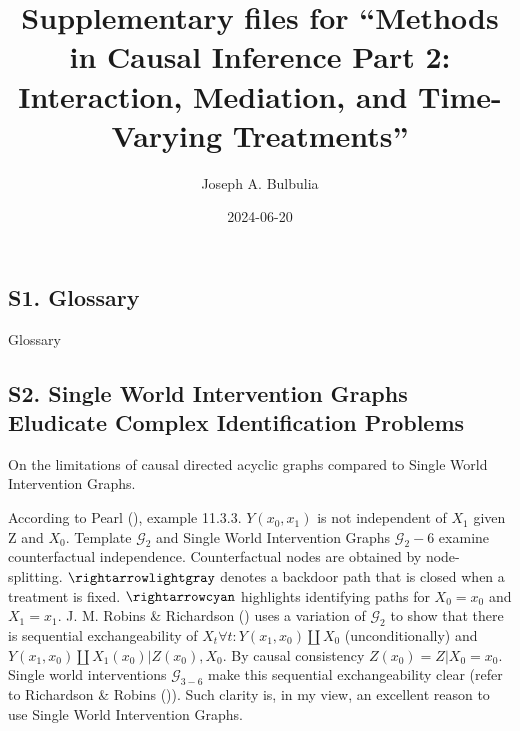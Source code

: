\documentclass[
  single column]{article}
\title{Supplementary files for ``Methods in Causal Inference Part 2:
Interaction, Mediation, and Time-Varying Treatments''}
\author{Joseph A. Bulbulia}
\affil{%
             \small{     Victoria University of Wellington, New Zealand
          ORCID \textcolor[HTML]{A6CE39}{\aiOrcid} ~0000-0002-5861-2056 }
              }
\date{2024-06-20}
\renewcommand*\contentsname{Table of contents}
\newcommand\contentsname{Table of contents}
\begin{document}
\maketitle

\renewcommand*\contentsname{Table of contents}
{
\hypersetup{linkcolor=}
\setcounter{tocdepth}{2}
\tableofcontents
}
\listoftables
\newpage{}

\subsection{S1. Glossary}\label{id-app-a}

\begin{table}

\caption{\label{tbl-experiments}Glossary}

\centering{

\glossaryTerms

}

\end{table}%

\newpage{}

\subsection{S2. Single World Intervention Graphs Eludicate Complex
Identification Problems}\label{id-app-b}

\begin{table}

\caption{\label{tbl-pearltable}On the limitations of causal directed
acyclic graphs compared to Single World Intervention Graphs.}

\centering{

\pearltable

}

\end{table}%

According to Pearl (), example 11.3.3.
\(Y(x_0, x_1)\) is not independent of \(X_1\) given Z and \(X_0\).
Template \(\mathcal{G}_2\) and Single World Intervention Graphs
\(\mathcal{G}_2-6\) examine counterfactual independence. Counterfactual
nodes are obtained by node-splitting. \(\rightarrowlightgray\) denotes a
backdoor path that is closed when a treatment is fixed.
\(\rightarrowcyan\) highlights identifying paths for \(X_0 = x_0\) and
\(X_1 = x_1\). J. M. Robins \& Richardson
() uses a variation of
\(\mathcal{G}_2\) to show that there is sequential exchangeability of
\(X_t \forall t: Y(x_1, x_0)\coprod X_0\) (unconditionally) and
\(Y(x_1, x_0)\coprod X_1(x_0) | Z(x_0), X_0\). By causal consistency
\(Z(x_0) = Z|X_0 = x_0\). Single world interventions
\(\mathcal{G}_{3-6}\) make this sequential exchangeability clear (refer
to Richardson \& Robins ()). Such
clarity is, in my view, an excellent reason to use Single World
Intervention Graphs.
\end{document}
